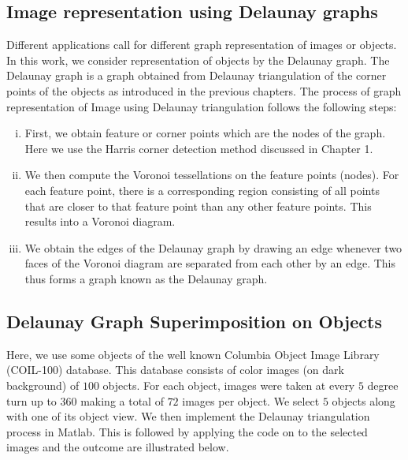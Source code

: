 \documentclass[10pt,a4paper]{article}
\theoremstyle{plain}
\theoremstyle{definition}
\begin{document}
\subsection{Image representation using Delaunay graphs} 
Different applications call for different graph representation of images or objects. In this work, we consider representation of objects by the Delaunay graph. The Delaunay graph is a graph obtained from Delaunay triangulation of the corner points of the objects as introduced in the previous chapters. The process of graph representation of Image using Delaunay triangulation follows the following steps:
\begin{enumerate}[i)]
	\item First, we obtain feature or corner points which are the nodes of the graph. Here we use the Harris corner detection method discussed in Chapter 1.
	\item  We then compute the Voronoi tessellations on the feature points (nodes). For each feature point, there is a corresponding region consisting of all points that are closer to that feature point than any other feature points. This results into a Voronoi diagram.
	\item We obtain the edges of the Delaunay graph by drawing an edge whenever two faces of the Voronoi diagram are separated from each other by an edge. This thus forms a graph known as the Delaunay graph.
\end{enumerate}

\subsection{Delaunay Graph Superimposition on Objects }
Here, we use some objects of the well known Columbia Object Image Library (COIL-100) database. This database consists of color images (on dark background) of $100$ objects. For each object, images were taken at every $5$ degree turn up to $360$ making a total of $72$ images per object. 
We select $5$ objects along with one of its object view. We then implement the Delaunay triangulation process in Matlab. This is followed by applying the code on to the selected images and the outcome are illustrated below.
\end{document}
